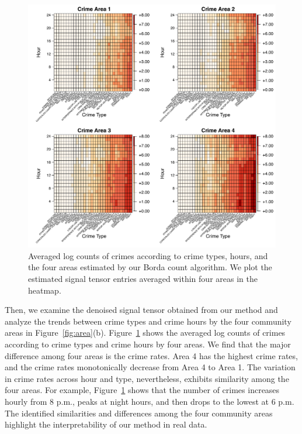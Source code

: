 \documentclass[12pt]{article}
\theoremstyle{definition}
\begin{document}
\begin{figure}[t!]
    \centering
    \includegraphics[width = \textwidth]{figure/CrimeA.pdf}
    \caption{Averaged log counts of crimes according to crime types, hours, and the four areas estimated by our Borda count algorithm. We plot the estimated signal tensor entries averaged within four areas in the heatmap.}
    \label{fig:crimeA}
\end{figure}


Then, we examine the denoised signal tensor obtained from our method and analyze the trends between crime types and crime hours by the four community areas in Figure~\ref{fig:area}(b). Figure~\ref{fig:crimeA} shows the averaged log counts of crimes according to crime types and crime hours by four areas. We find that the major difference among four areas is the crime rates. Area 4 has the highest crime rates,  and the crime rates monotonically decrease from Area 4 to Area 1. The variation in crime rates across hour and type, nevertheless, exhibits similarity among the four areas. For example, Figure~\ref{fig:crimeA} shows that the number of crimes increases hourly from 8 p.m., peaks at night hours, and then drops to the lowest at 6 p.m. 
The identified similarities and differences among the four community areas highlight the interpretability of our method in real data.
\end{document}
